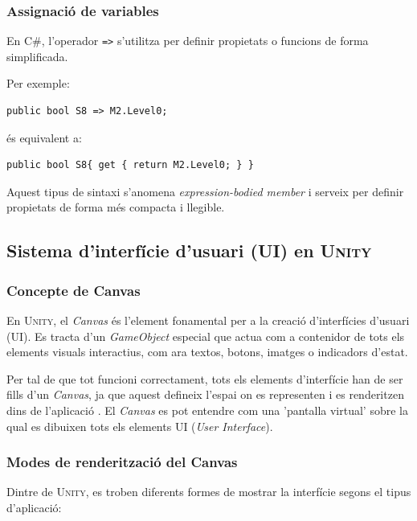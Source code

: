 \documentclass[a4paper,11pt,DIV=13,headings=normal,abstract=true,twoside=semi]{article}
\newcommand{\acro}[1]{\textsc{#1}}
\begin{document}
\subsubsection*{Assignació de variables}
En C\#, l'operador \texttt{=>} s'utilitza per definir propietats o funcions de forma simplificada.

Per exemple: \begin{lstlisting}[style=simple]
public bool S8 => M2.Level0;
\end{lstlisting}

és equivalent a:

\begin{lstlisting}[style=simple]
public bool S8{ get { return M2.Level0; } }
\end{lstlisting}

Aquest tipus de sintaxi s'anomena \emph{expression-bodied member} \cite{MicrosoftExpressionBodied} i serveix per definir propietats de forma més compacta i llegible.

\subsection{Sistema d'interfície d'usuari (UI) en \acro{Unity}}

\subsubsection{Concepte de Canvas}

En \acro{Unity}, el \emph{Canvas} és l'element fonamental per a la creació d'interfícies d'usuari (UI). Es tracta d'un \emph{GameObject} especial que actua com a contenidor de tots els elements visuals interactius, com ara textos, botons, imatges o indicadors d'estat.

Per tal de que tot funcioni correctament, tots els elements d'interfície han de ser fills d'un \emph{Canvas}, ja que aquest defineix l'espai on es representen i es renderitzen dins de l'aplicació \cite{UnityCanvas}. El \emph{Canvas} es pot entendre com una 'pantalla virtual' sobre la qual es dibuixen tots els elements \acro{UI} (\emph{User Interface}).

\subsubsection{Modes de renderització del Canvas}

Dintre de \acro{Unity}, es troben diferents formes de mostrar la interfície segons el tipus d'aplicació:
\end{document}
